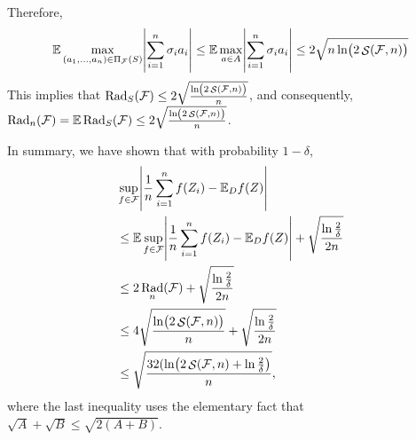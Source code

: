 \documentclass{article}
\DeclareMathOperator{\Rad}{{\mathrm{Rad}}}
\DeclareMathOperator*{\Scal}{{\cal S}}
\newcommand{\EE}{\mathbb{E}}
\newcommand{\Fcal}{\mathcal{F}}
\begin{document}
Therefore,
\begin{eqnarray*}
  \EE \max_{(a_1,\ldots,a_n) \in \Pi_\Fcal(S)} \abs{\sum_{i=1}^n \sigma_i a_i}
  \leq \EE \max_{a \in A} \abs{\sum_{i=1}^n \sigma_i a_i}
  \leq 2 \sqrt{n \ln(2\Scal(\Fcal, n))}
\end{eqnarray*}
This implies that $\Rad_S(\Fcal) \leq 2 \sqrt{\frac{\ln(2\Scal(\Fcal, n))}{n}}$,
and consequently, $\Rad_n(\Fcal) = \EE \Rad_S(\Fcal) \leq 2 \sqrt{\frac{\ln(2\Scal(\Fcal, n))}{n}}$.

In summary, we have shown that with probability $1-\delta$,
\begin{align*}
& \sup_{f \in \Fcal} \abs{\frac{1}{n} \sum_{i=1}^n f(Z_i) - \EE_D f(Z)} \\
& \leq \EE \sup_{f \in \Fcal} \abs{\frac{1}{n} \sum_{i=1}^n f(Z_i) - \EE_D f(Z)} + \sqrt{\frac{\ln\frac{2}{\delta}}{2n}} \\
& \leq 2\Rad_n(\Fcal) + \sqrt{\frac{\ln\frac{2}{\delta}}{2n}} \\
& \leq 4 \sqrt{\frac{\ln(2\Scal(\Fcal, n))}{n}} + \sqrt{\frac{\ln\frac{2}{\delta}}{2n}} \\
& \leq \sqrt{\frac{32(\ln(2\Scal(\Fcal, n) + \ln\frac{2}{\delta})}{n}},
\end{align*}
where the last inequality uses the elementary fact that $\sqrt{A} + \sqrt{B} \leq \sqrt{2(A+B)}$.

\end{document}

